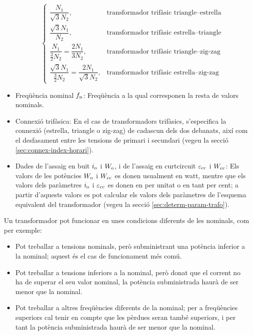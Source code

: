 \begin{itemize}
\begin{equation}
\begin{cases}
        \dfrac{N_1}{\sqrt{3}N_2}, & \text{transformador trifàsic triangle--estrella} \\[0.4cm]
        \dfrac{\sqrt{3}N_1}{N_2}, & \text{transformador trifàsic estrella--triangle} \\[0.4cm]
        \dfrac{N_1}{\frac{3}{2}N_2} = \dfrac{2 N_1}{3 N_2}, & \text{transformador trifàsic triangle--zig-zag} \\[0.4cm]
        \dfrac{\sqrt{3}N_1}{\frac{3}{2}N_2} = \dfrac{2 N_1}{\sqrt{3} N_2}, & \text{transformador trifàsic estrella--zig-zag}
         \end{cases}
       \end{equation}
   \item Freqüència nominal $f_\mathrm{n}$: Freqüència a la qual corresponen la resta de valors nominals.
   \item Connexió trifàsica: En el cas de transformadors trifàsics, s'especifica la connexió (estrella, triangle o zig-zag) de cadascun dels dos debanats, així com el desfasament entre les tensions de primari i secundari (vegeu la secció \vref{sec:connex-index-horari}).
   \item Dades de l'assaig en buit $i_\mathrm{o}$ i $W_\mathrm{o}$, i de l'assaig en curtcircuit $\varepsilon_\mathrm{cc}$ i $W_\mathrm{cc}$: Els valors de les potències $W_\mathrm{o}$ i $W_\mathrm{cc}$ es donen
usualment en watt, mentre que els valors dels paràmetres $i_\mathrm{o}$
i $\varepsilon_\mathrm{cc}$ es donen en per unitat o en tant per cent; a partir d'aquests valors es pot calcular els valors dels paràmetres de l'esquema equivalent del transformador  (vegeu la secció \vref{sec:determ-param-trafo}).
\end{itemize}

Un transformador pot funcionar en unes condicions diferents de les nominals, com per exemple:
\begin{itemize}
   \item Pot treballar a tensions nominals, però subministrant una potència inferior a la nominal; aquest és el cas de funcionament més comú.
   \item Pot treballar a tensions inferiors a la nominal, però donat que el corrent no ha de superar el seu valor nominal, la potència subministrada haurà de ser menor que la nominal.
   \item Pot treballar a altres freqüències diferents de la nominal; per a freqüències superiors cal tenir en compte que les pèrdues seran també superiors, i per tant la potència subministrada haurà de ser menor que la nominal.
\end{itemize}


